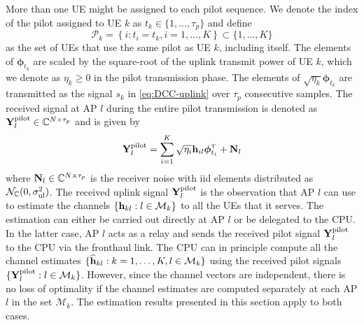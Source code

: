 More than one UE might be assigned to each pilot sequence. We denote  the index of the pilot assigned to UE $k$ as $t_k \in \{ 1, \ldots, \tau_p\}$ and define
\begin{equation}
\mathcal{P}_k = \left\{ i : t_i = t_k, i=1,\ldots,K  \right\} \subset \{ 1, \ldots, K\} 
\end{equation}
as the set of UEs that use the same pilot as UE $k$, including itself. The elements of $\boldsymbol{\phi}_{t_k}$ are scaled by the square-root of the uplink transmit power of UE $k$, which we denote as $\eta_k \geq 0 $ in the pilot transmission phase.
The elements of $\sqrt{\eta_k}\boldsymbol{\phi}_{t_k}$ are transmitted as the signal $s_k$ in \eqref{eq:DCC-uplink} over $\tau_p$ consecutive samples.
The received signal at \gls{AP} $l$ during the entire pilot transmission is denoted as
$\mathbf{Y}_{l}^{{\rm pilot}} \in \mathbb{C}^{N \times \tau_p}$ and
 is given by
\begin{equation} \label{eq:received-pilot-matrix}
\vect{Y}_{l}^{{\rm pilot}} = \sum_{i=1}^{K} \sqrt{\eta_i } \vect{h}_{il} \boldsymbol{\phi}_{t_i}^{\Ttran}+ \vect{N}_{l}
\end{equation}
where $\mathbf{N}_{l}  \in \mathbb{C}^{N \times \tau_p}$ is the receiver noise with \gls{iid} elements distributed as $ \mathcal{N}_{\mathbb{C}} (0, \sigma^2_{\mathrm{ul}} )$. The received uplink signal $\mathbf{Y}_{l}^{{\rm pilot}}$ is the observation that AP $l$ can use to estimate the channels $\{\mathbf{h}_{kl}:   l\in \mathcal{M}_k\}$ to all the UEs that it serves.
The estimation can either be carried out directly at \gls{AP} $l$ or  be delegated to the \gls{CPU}. In the latter case, \gls{AP} $l$ acts as a relay and sends the received pilot signal $\mathbf{Y}_{l}^{{\rm pilot}}$ to the \gls{CPU} via the fronthaul link. The CPU can in principle compute all the channel estimates $\{\widehat{\mathbf{h}}_{kl} : k=1,\ldots,K, l\in \mathcal{M}_k\}$ using the received pilot signals $\{\mathbf{Y}_{l}^{{\rm pilot}}:  l\in \mathcal{M}_k\}$. However, since the channel vectors are independent, there is no loss of optimality if the channel estimates are computed separately at each AP $l$ in the set $\mathcal{M}_k$. 
The estimation results presented in this section apply to both cases.


